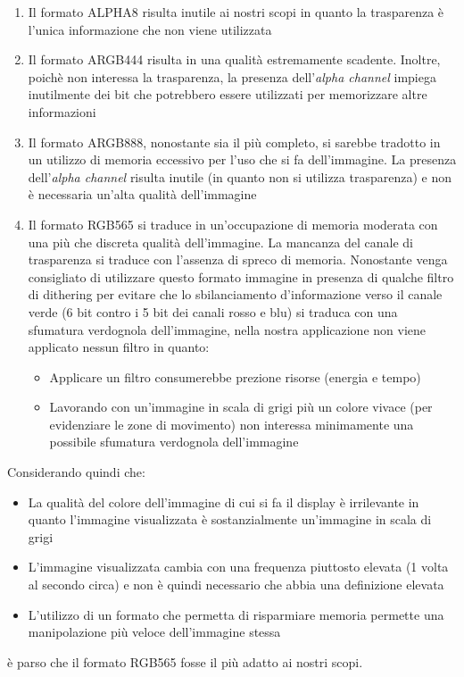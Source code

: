\begin{enumerate}
  \item Il formato ALPHA8 risulta inutile ai nostri scopi in quanto la trasparenza è l'unica informazione che non viene utilizzata
  \item Il formato ARGB444 risulta in una qualità estremamente scadente. Inoltre, poichè non interessa la trasparenza, la presenza dell'\textit{alpha channel} impiega inutilmente dei bit che potrebbero essere utilizzati per memorizzare altre informazioni
  \item Il formato ARGB888, nonostante sia il più completo, si sarebbe tradotto in un utilizzo di memoria eccessivo per l'uso che si fa dell'immagine. La presenza dell'\textit{alpha channel} risulta inutile (in quanto non si utilizza trasparenza) e non è necessaria un'alta qualità dell'immagine
  \item Il formato RGB565 si traduce in un'occupazione di memoria moderata con una più che discreta qualità dell'immagine. La mancanza del canale di trasparenza si traduce con l'assenza di spreco di memoria. Nonostante venga consigliato di utilizzare questo formato immagine in presenza di qualche filtro di dithering per evitare che lo sbilanciamento d'informazione verso il canale verde (6 bit contro i 5 bit dei canali rosso e blu) si traduca con una sfumatura verdognola dell'immagine, nella nostra applicazione non viene applicato nessun filtro in quanto:
  \begin{itemize}
    \item Applicare un filtro consumerebbe prezione risorse (energia e tempo)
    \item Lavorando con un'immagine in scala di grigi più un colore vivace (per evidenziare le zone di movimento) non interessa minimamente una possibile sfumatura verdognola dell'immagine
  \end{itemize}
\end{enumerate}
Considerando quindi che:
\begin{itemize}
  \item La qualità del colore dell'immagine di cui si fa il display è irrilevante in quanto l'immagine visualizzata è sostanzialmente un'immagine in scala di grigi
  \item L'immagine visualizzata cambia con una frequenza piuttosto elevata (1 volta al secondo circa) e non è quindi necessario che abbia una definizione elevata
  \item L'utilizzo di un formato che permetta di risparmiare memoria permette una manipolazione più veloce dell'immagine stessa
\end{itemize}
è parso che il formato RGB565 fosse il più adatto ai nostri scopi.


